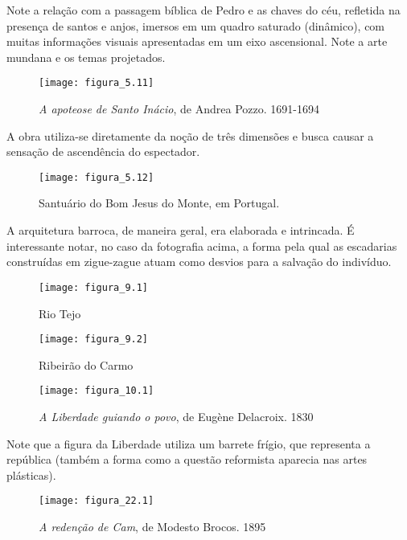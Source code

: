 Note a relação com a passagem bíblica de Pedro e as chaves do céu, refletida na presença de santos e anjos, imersos em um quadro saturado (dinâmico), com muitas informações visuais apresentadas em um eixo ascensional. Note a arte mundana e os temas projetados.

\newpage

\begin{figure}[h]
\texttt{[image: figura\_5.11]}
\caption{\textit{A apoteose de Santo Inácio}, de Andrea Pozzo. 1691-1694}
\label{fig:mesh5.11}
\end{figure}

A obra utiliza-se diretamente da noção de três dimensões e busca causar a sensação de ascendência do espectador.

\newpage

\begin{figure}[h]
\texttt{[image: figura\_5.12]}
\caption{Santuário do Bom Jesus do Monte, em Portugal.}
\label{fig:mesh5.12}
\end{figure}

A arquitetura barroca, de maneira geral, era elaborada e intrincada. É interessante notar, no caso da fotografia acima, a forma pela qual as escadarias construídas em zigue-zague atuam como desvios para a salvação do indivíduo.

\newpage

\begin{figure}[h]
\texttt{[image: figura\_9.1]}
\caption{Rio Tejo}
\label{fig:mesh9.1}
\end{figure}

\newpage

\begin{figure}[h]
\texttt{[image: figura\_9.2]}
\caption{Ribeirão do Carmo}
\label{fig:mesh9.2}
\end{figure}

\newpage

\begin{figure}[h]
\texttt{[image: figura\_10.1]}
\caption{\textit{A Liberdade guiando o povo}, de Eugène Delacroix. 1830}
\label{fig:mesh10.1}
\end{figure}

Note que a figura da Liberdade utiliza um barrete frígio, que representa a república (também a forma como a questão reformista aparecia nas artes plásticas).

\newpage

\begin{figure}[h]
\texttt{[image: figura\_22.1]}
\caption{\textit{A redenção de Cam}, de Modesto Brocos. 1895}
\label{fig:mesh22.1}
\end{figure}

